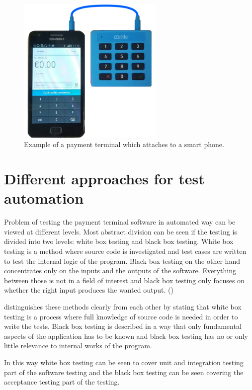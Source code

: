 \begin{figure}[ht]
  \begin{center}
    \includegraphics[width=7cm]{images/izettle.png}
    \caption{Example of a payment terminal which attaches to a smart phone.}
    \label{fig:izettle}
  \end{center}
\end{figure}

\section{Different approaches for test automation}

Problem of testing the payment terminal software in automated way can be viewed at different levels. Most abstract division can be seen if the testing is divided into two levels: white box testing and black box testing. White box testing is a method where source code is investigated and test cases are written to test the internal logic of the program. Black box testing on the other hand concentrates only on the inputs and the outputs of the software. Everything between those is not in a field of interest and black box testing only focuses on whether the right input produces the wanted output. (\emph{\cite{myers2011art}})

\emph{\cite{khan2012comparative}} distinguishes these methods clearly from each other by stating that white box testing is a process where full knowledge of source code is needed in order to write the tests. Black box testing is described in a way that only fundamental aspects of the application has to be known and black box testing has no or only little relevance to internal works of the program.

In this way white box testing can be seen to cover unit and integration testing part of the software testing and the black box testing can be seen covering the acceptance testing part of the testing.

